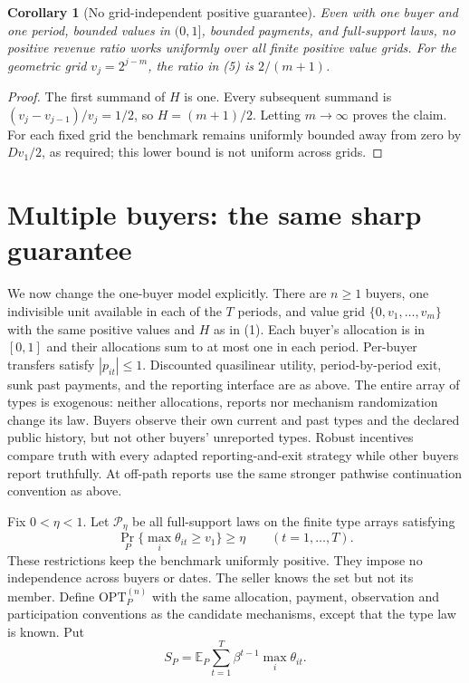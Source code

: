 \documentclass[11pt]{article}
\newtheorem{corollary}[theorem]{Corollary}
\theoremstyle{remark}\newtheorem{remark}[theorem]{Remark}
\newcommand{\E}{\mathbb E}
\begin{document}
\begin{corollary}[No grid-independent positive guarantee]\label{cor:none}
Even with one buyer and one period, bounded values in $(0,1]$, bounded payments, and full-support laws, no positive revenue ratio works uniformly over all finite positive value grids. For the geometric grid $v_j=2^{j-m}$, the ratio in (5) is $2/(m+1)$.
\end{corollary}
\begin{proof}
The first summand of $H$ is one. Every subsequent summand is $(v_j-v_{j-1})/v_j=1/2$, so $H=(m+1)/2$. Letting $m\to\infty$ proves the claim. For each fixed grid the benchmark remains uniformly bounded away from zero by $Dv_1/2$, as required; this lower bound is not uniform across grids.
\end{proof}


\section*{Multiple buyers: the same sharp guarantee}
We now change the one-buyer model explicitly. There are $n\geq1$ buyers,
one indivisible unit available in each of the $T$ periods, and value grid
$\{0,v_1,\ldots,v_m\}$ with the same positive values and $H$ as in (1).
Each buyer's allocation is in $[0,1]$ and their allocations sum to at most
one in each period. Per-buyer transfers satisfy $|p_{it}|\leq1$.
Discounted quasilinear utility, period-by-period exit, sunk past payments,
and the reporting interface are as above. The entire array of types is
exogenous: neither allocations, reports nor mechanism randomization change
its law. Buyers observe their own current and past types and the declared
public history, but not other buyers' unreported types. Robust incentives
compare truth with every adapted reporting-and-exit strategy while other
buyers report truthfully. At off-path reports use the same stronger
pathwise continuation convention as above.

Fix $0<\eta<1$. Let $\mathcal P_\eta$ be all full-support laws on the
finite type arrays satisfying
\[
 \Pr_P\{\max_i\theta_{it}\geq v_1\}\geq\eta
 \qquad(t=1,\ldots,T).
\]
These restrictions keep the benchmark uniformly positive. They impose no
independence across buyers or dates. The seller knows the set but not its
member. Define $\mathrm{OPT}^{(n)}_P$ with the same allocation, payment,
observation and participation conventions as the candidate mechanisms,
except that the type law is known. Put
\[
 S_P=\E_P\sum_{t=1}^T\beta^{t-1}\max_i\theta_{it}.
\]
\end{document}
